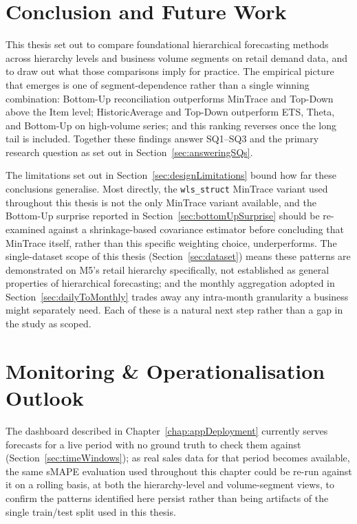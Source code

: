 \section{Conclusion and Future Work}
\label{sec:conclusionFutureWork}

This thesis set out to compare foundational hierarchical forecasting methods across hierarchy levels and business volume segments on retail demand data, and to draw out what those comparisons imply for practice. The empirical picture that emerges is one of segment-dependence rather than a single winning combination: Bottom-Up reconciliation outperforms MinTrace and Top-Down above the Item level; HistoricAverage and Top-Down outperform ETS, Theta, and Bottom-Up on high-volume series; and this ranking reverses once the long tail is included. Together these findings answer SQ1--SQ3 and the primary research question as set out in Section~\ref{sec:answeringSQs}.

The limitations set out in Section~\ref{sec:designLimitations} bound how far these conclusions generalise. Most directly, the \texttt{wls\_struct} MinTrace variant used throughout this thesis is not the only MinTrace variant available, and the Bottom-Up surprise reported in Section~\ref{sec:bottomUpSurprise} should be re-examined against a shrinkage-based covariance estimator before concluding that MinTrace itself, rather than this specific weighting choice, underperforms. The single-dataset scope of this thesis (Section~\ref{sec:dataset}) means these patterns are demonstrated on M5's retail hierarchy specifically, not established as general properties of hierarchical forecasting; and the monthly aggregation adopted in Section~\ref{sec:dailyToMonthly} trades away any intra-month granularity a business might separately need. Each of these is a natural next step rather than a gap in the study as scoped.

\section{Monitoring \& Operationalisation Outlook}
\label{sec:monitoringOutlook}

The dashboard described in Chapter~\ref{chap:appDeployment} currently serves forecasts for a live period with no ground truth to check them against (Section~\ref{sec:timeWindows}); as real sales data for that period becomes available, the same sMAPE evaluation used throughout this chapter could be re-run against it on a rolling basis, at both the hierarchy-level and volume-segment views, to confirm the patterns identified here persist rather than being artifacts of the single train/test split used in this thesis.

